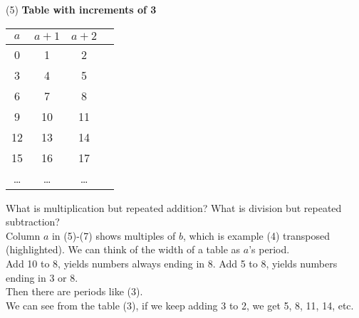 \begin{minipage}{0.45\textwidth}

    (5) \textbf{Table with increments of 3}\\
    \begin{tabular}{c|ccc}
        $a$                       & $a+1$ & $a+2$ \\
        \hline
        \rowcolor{OliveGreen!10}0 & 1     & 2     \\
        \rowcolor{OliveGreen!10}3 & 4     & 5     \\
        \rowcolor{OliveGreen!10}6 & 7     & 8     \\
        9                         & 10    & 11    \\
        12                        & 13    & 14    \\
        15                        & 16    & 17    \\
        \dots                     & \dots & \dots \\
    \end{tabular}
\end{minipage}%
\hspace{0.05\textwidth} %
\begin{minipage}{0.5\textwidth}
    What is multiplication but repeated addition?
    What is division but repeated subtraction?\\

    \noindent
    Column $a$ in (5)-(7) shows multiples of $b$, which is
    example (4) transposed (highlighted). We can think
    of the width of a table as $a$'s period.\\

    \noindent
    Add 10 to 8, yields numbers always ending in 8.
    Add 5 to 8, yields numbers ending in 3 or 8.\\
    Then there are periods like (3).\\

    \noindent
    We can see from the table (3), if we keep adding 3 to 2,
    we get 5, 8, 11, 14, etc.\\

\end{minipage}

\vspace{0.5cm} %

